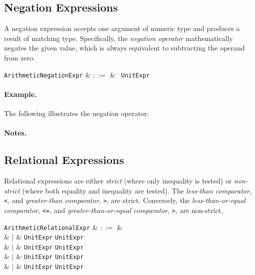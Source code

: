 
\subsection{Negation Expressions}
\label{c_expr_negation}

A negation expression accepts one argument of numeric type and produces a result of matching type.  Specifically, the {\em negation operator} mathematically negates the given value, which is always equivalent to subtracting the operand from zero.

\begin{syntax}
\verb+ArithmeticNegationExpr+ & $::=$ & \token{-}\ \verb+UnitExpr+\\
\end{syntax}

\paragraph{Example.} The following illustrates the negation operator:



\paragraph{Notes.}


\subsection{Relational Expressions}
\label{c_expr_relational}
Relational expressions are either {\em strict} (where only inequality is tested)  or {\em non-strict} (where both equality and inequality are tested).  The {\em less-than comparator}, \lstinline{<}, and {\em greater-than comparator}, \lstinline{>}, are strict.  Conversely, the {\em less-than-or-equal comparator}, \lstinline{<=}, and {\em greater-than-or-equal comparator}, \lstinline{>}, are non-strict.

\begin{syntax}
  \verb+ArithmeticRelationalExpr+ & $::=$ &\\
  & $|$ & \verb+UnitExpr+ \token{<} \verb+UnitExpr+\\
  & $|$ & \verb+UnitExpr+ \token{<=} \verb+UnitExpr+\\
  & $|$ & \verb+UnitExpr+ \token{=>} \verb+UnitExpr+\\
  & $|$ & \verb+UnitExpr+ \token{>} \verb+UnitExpr+\\
\end{syntax}

